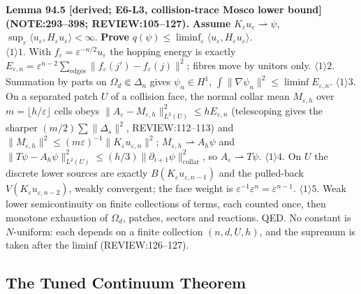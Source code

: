 \textbf{Lemma 94.5 [derived; E6-L3, collision-trace Mosco lower bound] (NOTE:293--398; REVIEW:105--127).}  \textbf{Assume}
\(K_\varepsilon u_\varepsilon\rightharpoonup\psi\), \(\sup_\varepsilon\langle u_\varepsilon,H_\varepsilon u_\varepsilon\rangle<\infty\).  \textbf{Prove}
\(q(\psi)\le\liminf_\varepsilon\langle u_\varepsilon,H_\varepsilon u_\varepsilon\rangle\).\\
\(\langle1\rangle1\). With \(f_\varepsilon=\varepsilon^{-n/2}u_\varepsilon\) the hopping energy is exactly \(E_{\varepsilon,n}=\varepsilon^{n-2}\sum_{\text{edges}}\|f_\varepsilon(j')-f_\varepsilon(j)\|^2\);
fibres move by unitors only.  \(\langle1\rangle2\). Summation by parts on \(\Omega_d\Subset\Delta_n\) gives \(\psi_n\in H^1\), \(\int\|\nabla\psi_n\|^2\le\liminf E_{\varepsilon,n}\).
\(\langle1\rangle3\). On a separated patch \(U\) of a collision face, the normal collar mean \(M_{\varepsilon,h}\) over \(m=\lfloor h/\varepsilon\rfloor\)
cells obeys \(\|A_\varepsilon-M_{\varepsilon,h}\|^2_{L^2(U)}\le hE_{\varepsilon,n}\) (telescoping gives the sharper \((m/2)\sum\|\Delta_s\|^2\),
REVIEW:112--113) and \(\|M_{\varepsilon,h}\|^2\le(m\varepsilon)^{-1}\|K_\varepsilon u_{\varepsilon,n}\|^2\); \(M_{\varepsilon,h}\rightharpoonup A_h\psi\) and
\(\|T\psi-A_h\psi\|^2_{L^2(U)}\le(h/3)\|\partial_{i+1}\psi\|^2_{\mathrm{collar}}\), so \(A_\varepsilon\rightharpoonup T\psi\).
\(\langle1\rangle4\). On \(U\) the discrete lower sources are exactly \(B(K_\varepsilon u_{\varepsilon,n-1})\) and the pulled-back
\(V(K_\varepsilon u_{\varepsilon,n-2})\), weakly convergent; the face weight is \(\varepsilon^{-1}\varepsilon^n=\varepsilon^{n-1}\).
\(\langle1\rangle5\). Weak lower semicontinuity on finite collections of terms, each counted once, then monotone exhaustion of
\(\Omega_d\), patches, sectors and reactions.  QED.  No constant is \(N\)-uniform: each depends on a finite collection
\((n,d,U,h)\), and the supremum is taken after the liminf (REVIEW:126--127).

\subsection{The Tuned Continuum Theorem}

